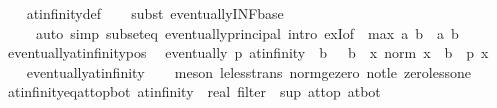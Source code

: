 \begin{isabellebody}
%
\isadelimproof
\ \ %
\endisadelimproof
%
\isatagproof
{}\isamarkupfalse%
\ at{\isacharunderscore}{\kern0pt}infinity{\isacharunderscore}{\kern0pt}def\isanewline
\ \ \isamarkupfalse%
\ {\isacharparenleft}{\kern0pt}subst\ eventually{\isacharunderscore}{\kern0pt}INF{\isacharunderscore}{\kern0pt}base{\isacharparenright}{\kern0pt}\isanewline
\ \ \ \ \ {\isacharparenleft}{\kern0pt}auto\ simp{\isacharcolon}{\kern0pt}\ subset{\isacharunderscore}{\kern0pt}eq\ eventually{\isacharunderscore}{\kern0pt}principal\ intro{\isacharbang}{\kern0pt}{\isacharcolon}{\kern0pt}\ exI{\isacharbrackleft}{\kern0pt}of\ {\isacharunderscore}{\kern0pt}\ {\isachardoublequoteopen}max\ a\ b{\isachardoublequoteclose}\ \ a\ b{\isacharbrackright}{\kern0pt}{\isacharparenright}{\kern0pt}%
\endisatagproof
{\isafoldproof}%
%
\isadelimproof
\isanewline
%
\endisadelimproof
\isanewline
{}\isamarkupfalse%
\ eventually{\isacharunderscore}{\kern0pt}at{\isacharunderscore}{\kern0pt}infinity{\isacharunderscore}{\kern0pt}pos{\isacharcolon}{\kern0pt}\isanewline
\ \ {\isachardoublequoteopen}eventually\ p\ at{\isacharunderscore}{\kern0pt}infinity\ {\isasymlongleftrightarrow}\ {\isacharparenleft}{\kern0pt}{\isasymexists}b{\isachardot}{\kern0pt}\ {}\ {\isacharless}{\kern0pt}\ b\ {\isasymand}\ {\isacharparenleft}{\kern0pt}{\isasymforall}x{\isachardot}{\kern0pt}\ norm\ x\ {\isasymge}\ b\ {\isasymlongrightarrow}\ p\ x{\isacharparenright}{\kern0pt}{\isacharparenright}{\kern0pt}{\isachardoublequoteclose}\isanewline
%
\isadelimproof
\ \ %
\endisadelimproof
%
\isatagproof
{}\isamarkupfalse%
\ eventually{\isacharunderscore}{\kern0pt}at{\isacharunderscore}{\kern0pt}infinity\isanewline
\ \ \isamarkupfalse%
\ {\isacharparenleft}{\kern0pt}meson\ le{\isacharunderscore}{\kern0pt}less{\isacharunderscore}{\kern0pt}trans\ norm{\isacharunderscore}{\kern0pt}ge{\isacharunderscore}{\kern0pt}zero\ not{\isacharunderscore}{\kern0pt}le\ zero{\isacharunderscore}{\kern0pt}less{\isacharunderscore}{\kern0pt}one{\isacharparenright}{\kern0pt}%
\endisatagproof
{\isafoldproof}%
%
\isadelimproof
\isanewline
%
\endisadelimproof
\isanewline
{}\isamarkupfalse%
\ at{\isacharunderscore}{\kern0pt}infinity{\isacharunderscore}{\kern0pt}eq{\isacharunderscore}{\kern0pt}at{\isacharunderscore}{\kern0pt}top{\isacharunderscore}{\kern0pt}bot{\isacharcolon}{\kern0pt}\ {\isachardoublequoteopen}{\isacharparenleft}{\kern0pt}at{\isacharunderscore}{\kern0pt}infinity\ {\isacharcolon}{\kern0pt}{\isacharcolon}{\kern0pt}\ real\ filter{\isacharparenright}{\kern0pt}\ {\isacharequal}{\kern0pt}\ sup\ at{\isacharunderscore}{\kern0pt}top\ at{\isacharunderscore}{\kern0pt}bot{\isachardoublequoteclose}\isanewline

\end{isabellebody}
